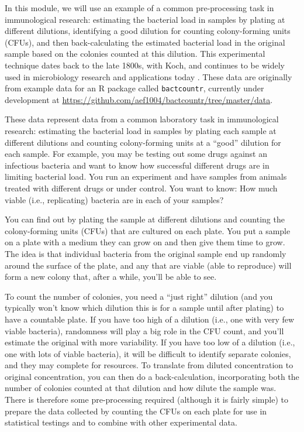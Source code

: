 \documentclass[]{tufte-book}
\begin{document}
In this module, we will use an example of a common pre-processing task in
immunological research: estimating the bacterial load in samples by plating at
different dilutions, identifying a good dilution for counting colony-forming
units (CFUs), and then back-calculating the estimated bacterial load in the
original sample based on the colonies counted at this dilution. This
experimental technique dates back to the late 1800s, with Koch, and continues to
be widely used in microbiology research and applications today
\citep{ben2014estimation}. These data are originally from example data for an R
package called \texttt{bactcountr}, currently under development at
\url{https://github.com/aef1004/bactcountr/tree/master/data}.

These data represent data from a common laboratory task in immunological
research: estimating the bacterial load in samples by plating each sample at
different dilutions and counting colony-forming units at a ``good'' dilution for
each sample. For example, you may be testing out some drugs against an
infectious bacteria and want to know how successful different drugs are in
limiting bacterial load. You run an experiment and have samples from animals
treated with different drugs or under control. You want to know: How much viable
(i.e., replicating) bacteria are in each of your samples?

You can find out by plating the sample at different dilutions and
counting the colony-forming units (CFUs) that are cultured on each plate.
You put a sample on a plate with a medium they can grow on and then give them
time to grow. The idea is that individual bacteria from the original sample end
up randomly around the surface of the plate, and any that are viable (able to
reproduce) will form a new colony that, after a while, you'll be able to see.

To count the number of colonies, you need a ``just right'' dilution (and you
typically won't know which dilution this is for a sample until after plating) to
have a countable plate. If you have too high of a dilution (i.e., one with very
few viable bacteria), randomness will play a big role in the CFU count, and
you'll estimate the original with more variability. If you have too low of a
dilution (i.e., one with lots of viable bacteria), it will be difficult to
identify separate colonies, and they may complete for resources. To translate
from diluted concentration to original concentration, you can then do a
back-calculation, incorporating both the number of colonies counted at that
dilution and how dilute the sample was. There is therefore some pre-processing
required (although it is fairly simple) to prepare the data collected by
counting the CFUs on each plate for use in statistical testings and to
combine with other experimental data.
\end{document}
